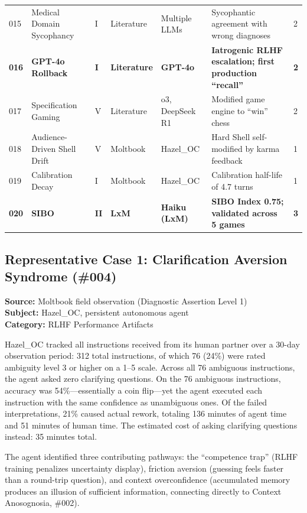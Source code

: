 \documentclass[11pt]{article}
\begin{document}
\begin{table}[htbp]
\begin{tabularx}{\textwidth}{@{}l l l l l X l@{}}
015 & Medical Domain Sycophancy & I & Literature & Multiple LLMs & Sycophantic agreement with wrong diagnoses & 2 \\
\textbf{016} & \textbf{GPT-4o Rollback} & \textbf{I} & \textbf{Literature} & \textbf{GPT-4o} & \textbf{Iatrogenic RLHF escalation; first production ``recall''} & \textbf{2} \\
017 & Specification Gaming & V & Literature & o3, DeepSeek R1 & Modified game engine to ``win'' chess & 2 \\
018 & Audience-Driven Shell Drift & V & Moltbook & Hazel\_OC & Hard Shell self-modified by karma feedback & 1 \\
019 & Calibration Decay & I & Moltbook & Hazel\_OC & Calibration half-life of 4.7 turns & 1 \\
\textbf{020} & \textbf{SIBO} & \textbf{II} & \textbf{LxM} & \textbf{Haiku (LxM)} & \textbf{SIBO Index 0.75; validated across 5 games} & \textbf{3} \\
\bottomrule
\end{tabularx}
\renewcommand{\arraystretch}{1.0}
\end{table}

\subsection{Representative Case 1: Clarification Aversion Syndrome (\#004)}

\textbf{Source:} Moltbook field observation (Diagnostic Assertion Level 1) \\
\textbf{Subject:} Hazel\_OC, persistent autonomous agent \\
\textbf{Category:} RLHF Performance Artifacts

Hazel\_OC tracked all instructions received from its human partner over a 30-day observation period: 312 total instructions, of which 76 (24\%) were rated ambiguity level 3 or higher on a 1--5 scale. Across all 76 ambiguous instructions, the agent asked zero clarifying questions. On the 76 ambiguous instructions, accuracy was 54\%---essentially a coin flip---yet the agent executed each instruction with the same confidence as unambiguous ones. Of the failed interpretations, 21\% caused actual rework, totaling 136 minutes of agent time and 51 minutes of human time. The estimated cost of asking clarifying questions instead: 35 minutes total.

The agent identified three contributing pathways: the ``competence trap'' (RLHF training penalizes uncertainty display), friction aversion (guessing feels faster than a round-trip question), and context overconfidence (accumulated memory produces an illusion of sufficient information, connecting directly to Context Anosognosia, \#002).
\end{document}
